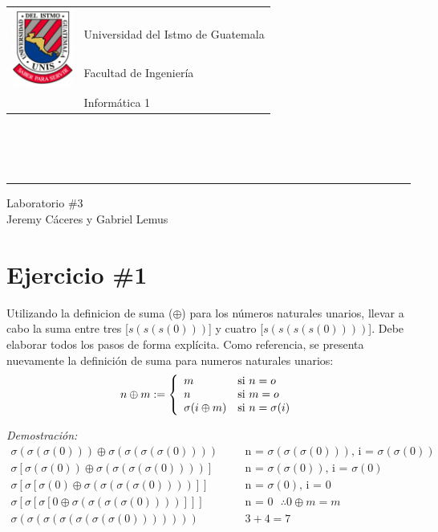 \documentclass[11pt,letterpaper]{article}
\begin{document}
\begin{tabular}{l l}
\multirow{3}{*}{\includegraphics[width=2cm]{../../recursos/logo}} 
 & \\
 & \LARGE Universidad del Istmo de Guatemala \\
 & \LARGE Facultad de Ingeniería \\
 & \LARGE Informática 1 \\
\end{tabular}
\\\\\\

\begin{center}
	\hrule
	\vspace{0.5cm}
	\huge{Laboratorio \#3} \\
	\vspace{0.1cm}
    \Large{Jeremy Cáceres y Gabriel Lemus}\\
    \vspace{0.05cm}
    \hrulefill
\end{center}
\vspace{0.05cm}

\section*{Ejercicio \#1}
\noindent Utilizando la definicion de suma ($\oplus$) para los números naturales unarios, llevar
a cabo la suma entre tres [$s(s(s(0)))$] y cuatro [$s(s(s(s(0))))$]. Debe elaborar todos
los pasos de forma explícita. Como referencia, se presenta nuevamente la definición de
suma para numeros naturales unarios:
\[
	n\oplus m := \left\{
    \begin{array}{l l}
    	m & \mbox{si } n=o \\
    	n & \mbox{si } m=o \\
    	\sigma(i\oplus m) & \mbox{si } n=\sigma(i) \\
    \end{array}
    \right.
\]

\noindent \emph{Demostración:}
\begin{align}
\sigma(\sigma(\sigma(0))) \oplus \sigma(\sigma(\sigma(\sigma(0))))& && \text{n\ =\ $\sigma(\sigma(\sigma(0)))$, \ i\ =\ $\sigma(\sigma(0))$} \\
\sigma[\sigma(\sigma(0)) \oplus \sigma(\sigma(\sigma(\sigma(0))))]& && \text{n\ =\ $\sigma(\sigma(0))$, \ i\ =\ $\sigma(0)$} \\
\sigma[\sigma[\sigma(0) \oplus \sigma(\sigma(\sigma(\sigma(0))))]]& && \text{n\ =\ $\sigma(0)$, \ i\ =\ $0$} \\
\sigma[\sigma[\sigma[0 \oplus \sigma(\sigma(\sigma(\sigma(0))))]]]& && \text{n\ =\ $0$ \ \ \ $\therefore 0 \oplus m=m$} \\
\sigma(\sigma(\sigma(\sigma(\sigma(\sigma(\sigma(0)))))))& && \text{$3+4=7$}
\end{align}
\end{document}
